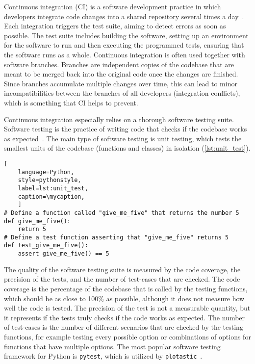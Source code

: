 Continuous integration (CI) is a software development practice in which
developers integrate code changes into a shared repository several times a
day~\cite{duvall2007continuous}. Each integration triggers the test suite,
aiming to detect errors as soon as possible. The test suite includes building
the software, setting up an environment for the software to run and then
executing the programmed tests, ensuring that the software runs as a whole.
Continuous integration is often used together with software branches. Branches
are independent copies of the codebase that are meant to be merged back into the
original code once the changes are finished. Since branches accumulate multiple
changes over time, this can lead to minor incompatibilities between the branches
of all developers (integration conflicts), which is something that CI helps to
prevent.

Continuous integration especially relies on a thorough software testing suite.
Software testing is the practice of writing code that checks if the codebase
works as expected~\cite{10.5555/2161638}. The main type of software testing is
unit testing, which tests the smallest units of the codebase (functions and
classes) in isolation (\autoref{lst:unit_test}).

\def\mycaption{ Example of an arbitrary Python function and its respective unit
    test function. The first function simply returns the number 5. The second
    function tests if the first function indeed returns the number 5. The test
    function is named with the prefix ``\texttt{test\_}'' and is placed in a
    file that ends with the suffix ``\texttt{\_test.py}''. The test function is
    executed by the testing framework \texttt{pytest}. Note that code after
    ``\texttt{\#}'' is considered a comment and won't be executed.}
\begin{lstlisting}[
    language=Python, 
    style=pythonstyle,
    label=lst:unit_test, 
    caption=\mycaption,
    ]
# Define a function called "give_me_five" that returns the number 5
def give_me_five():
    return 5
# Define a test function asserting that "give_me_five" returns 5
def test_give_me_five():
    assert give_me_five() == 5 
\end{lstlisting}

The quality of the software testing suite is measured by the code coverage, the
precision of the tests, and the number of test-cases that are checked. The code
coverage is the percentage of the codebase that is called by the testing
functions, which should be as close to 100\% as possible, although it does not
measure how well the code is tested. The precision of the test is not a
measurable quantity, but it represents if the tests truly checks if the code
works as expected. The number of test-cases is the number of different scenarios
that are checked by the testing functions, for example testing every possible
option or combinations of options for functions that have multiple options. The
most popular software testing framework for Python is \texttt{pytest}, which is
utilized by \texttt{plotastic}~\cite{pytestx.y}.

